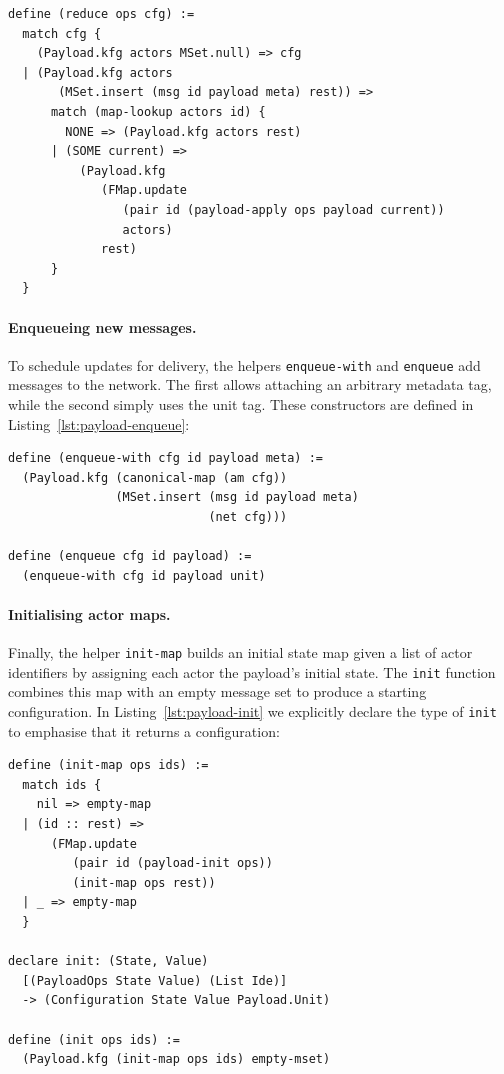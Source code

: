 \begin{lstlisting}[language=Athena,style=athena]
define (reduce ops cfg) :=
  match cfg {
    (Payload.kfg actors MSet.null) => cfg
  | (Payload.kfg actors
       (MSet.insert (msg id payload meta) rest)) =>
      match (map-lookup actors id) {
        NONE => (Payload.kfg actors rest)
      | (SOME current) =>
          (Payload.kfg
             (FMap.update
                (pair id (payload-apply ops payload current))
                actors)
             rest)
      }
  }
\end{lstlisting}

\paragraph{Enqueueing new messages.} To schedule updates for delivery, the helpers \lstinline{enqueue-with} and \lstinline{enqueue} add messages to the network. The first allows attaching an arbitrary metadata tag, while the second simply uses the unit tag. These constructors are defined in Listing~\ref{lst:payload-enqueue}:

\begin{lstlisting}[language=Athena,style=athena]
define (enqueue-with cfg id payload meta) :=
  (Payload.kfg (canonical-map (am cfg))
               (MSet.insert (msg id payload meta)
                            (net cfg)))

define (enqueue cfg id payload) :=
  (enqueue-with cfg id payload unit)
\end{lstlisting}

\paragraph{Initialising actor maps.} Finally, the helper \lstinline{init-map} builds an initial state map given a list of actor identifiers by assigning each actor the payload’s initial state. The \lstinline{init} function combines this map with an empty message set to produce a starting configuration. In Listing~\ref{lst:payload-init} we explicitly declare the type of \lstinline{init} to emphasise that it returns a configuration:

\begin{lstlisting}[language=Athena,style=athena]
define (init-map ops ids) :=
  match ids {
    nil => empty-map
  | (id :: rest) =>
      (FMap.update
         (pair id (payload-init ops))
         (init-map ops rest))
  | _ => empty-map
  }

declare init: (State, Value)
  [(PayloadOps State Value) (List Ide)]
  -> (Configuration State Value Payload.Unit)

define (init ops ids) :=
  (Payload.kfg (init-map ops ids) empty-mset)
\end{lstlisting}

